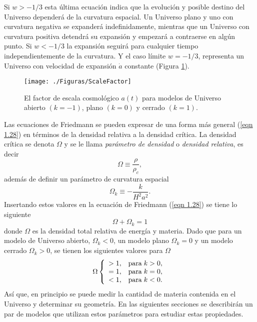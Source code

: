 \documentclass[a4paper,openright,12pt]{book}
\begin{document}
Si $w > -1/3$ esta última ecuación indica que la evolución y posible destino del Universo dependerá de la curvatura espacial. Un Universo plano y uno con curvatura negativa se expanderá indefinidamente, mientras que un Universo con curvatura positiva detendrá su expansión y empezará a contraerse en algún punto. Si $w < -1/3$ la expansión seguirá para cualquier tiempo independientemente de la curvatura. Y el caso límite $w = - 1/3$, representa un Universo con velocidad de expansión $\dot{a}$ constante (Figura \ref{fig 1.1}).
\begin{figure}
\centering
    \texttt{[image: ./Figuras/ScaleFactor]}
  \caption{\footnotesize{El factor de escala cosmológico $a(t)$ para modelos de Universo abierto $(k = -1)$, plano $(k = 0)$ y cerrado $(k = 1)$.}}
  \label{fig 1.1}
\end{figure}

Las ecuaciones de Friedmann se pueden expresar de una forma más general (\ref{eqn 1.28}) en términos de la densidad relativa a la densidad crítica. La densidad crítica se denota $\Omega$ y se le llama \textit{parámetro de densidad} o \textit{densidad relativa}, es decir
\begin{equation}
\Omega \equiv \frac{\rho}{\rho_{c}},\label{eqn 1.38}
\end{equation}
además de definir un parámetro de curvatura espacial
\begin{equation}
\Omega_{k} \equiv -\frac{k}{H^{2}a^{2}}.\label{eqn 1.39}
\end{equation}
Insertando estos valores en la ecuación de Friedmann (\ref{eqn 1.28}) se tiene lo siguiente
\begin{equation}
\Omega + \Omega_{k} = 1\label{eqn 1.40}
\end{equation}
donde $\Omega$ es la densidad total relativa de energía y materia. Dado que para un modelo de Universo abierto, $\Omega_{k} < 0$, un modelo plano $\Omega_{k} = 0 $ y un modelo cerrado $\Omega_{k} > 0$, se tienen los siguientes valores para $\Omega$
\begin{equation}
\Omega  \left\lbrace
\begin{array}{ll}
> 1, & \textup{para} \; k > 0, \\
= 1, & \textup{para} \; k = 0, \\
< 1, & \textup{para} \; k < 0. \\ \label{eqn 1.41}
\end{array}
\right.
\end{equation}
Así que, en principio se puede medir la cantidad de materia contenida en el Universo y determinar su geometría. En las siguientes secciones se describirán un par de modelos que utilizan estos parámetros para estudiar estas propiedades.
\end{document}
